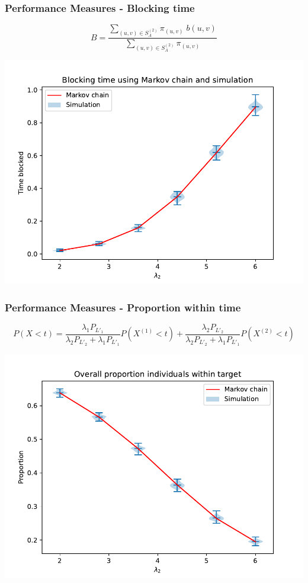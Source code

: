 \begin{frame}
    \frametitle{Performance Measures - Blocking time}
    \centering
    \begin{equation}
        B = \frac{\sum_{(u,v) \in S_A^{(2)}} \pi_{(u,v)} \; 
        b(u,v)}{\sum_{(u,v) \in S_A^{(2)}} \pi_{(u,v)}}
    \end{equation}

    \includegraphics[scale=0.5]{Bin/blocking_comparison.pdf}
\end{frame}


\begin{frame}
    \frametitle{Performance Measures - Proportion within time}
    \centering
    
    \small
    \begin{equation}
        P(X < t) = \frac{\lambda_1 P_{L'_1}}{\lambda_2 P_{L'_2}+\lambda_1 P_{L'_1}} 
        P(X^{(1)} < t) + \frac{\lambda_2 P_{L'_2}}{\lambda_2 P_{L'_2} + 
        \lambda_1 P_{L'_1}}P(X^{(2)} < t) 
    \end{equation}
    \normalsize

    \includegraphics[scale=0.5]{Bin/proportion_overall_comparison.pdf}

\end{frame}

